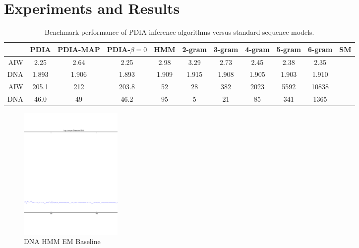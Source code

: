 \section{Experiments and Results}


\begin{table}[t]
    \begin{center}
    \setlength{\tabcolsep}{1.3mm}
\begin{tabular}{r|cccccccccc}
\hline
& {\bf PDIA } & PDIA-MAP & PDIA-$\beta=0$ & HMM & 2-gram& 3-gram & 4-gram & 5-gram & 6-gram & SM \\
\hline
AIW & 2.25 & 2.64 & 2.25 & 2.98 & 3.29 & 2.73 & 2.45 & 2.38 & 2.35 &\\
DNA & 1.893 & 1.906 & 1.893 & 1.909 & 1.915 & 1.908 & 1.905 & 1.903 & 1.910 & \\
\hline
\hline
AIW & 205.1 & 212 & 203.8 & 52 & 28 & 382 & 2023 & 5592 & 10838 &\\
DNA & 46.0 & 49 & 46.2 & 95 & 5 & 21 & 85 & 341 & 1365 & \\
\hline
\end{tabular}
\end{center}
\caption[Short]{Benchmark performance of PDIA inference algorithms versus standard sequence models.}
\label{table:results}
\end{table}

\begin{figure}[htbp]
\begin{center}
\includegraphics[width=5cm]{results/dna_hmm_baseline}
\caption{DNA HMM EM Baseline}
\label{fig:dna_hmm_baseline}
\end{center}
\end{figure}


